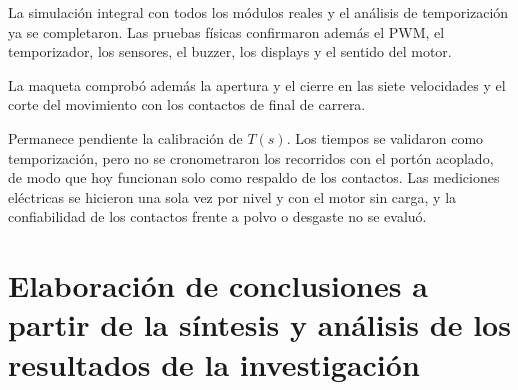 \documentclass[12pt,letterpaper]{article}
\begin{document}
La simulación integral con todos los módulos reales y el
análisis de temporización ya se completaron. Las pruebas
físicas confirmaron además el PWM, el temporizador, los
sensores, el buzzer, los displays y el sentido del motor.

La maqueta comprobó además la apertura y el cierre en
las siete velocidades y el corte del movimiento con los
contactos de final de carrera.

Permanece pendiente la calibración de $T(s)$. Los tiempos
se validaron como temporización, pero no se cronometraron
los recorridos con el portón acoplado, de modo que hoy
funcionan solo como respaldo de los contactos. Las
mediciones eléctricas se hicieron una sola vez por nivel
y con el motor sin carga, y la confiabilidad de los
contactos frente a polvo o desgaste no se evaluó.


\section{Elaboración de conclusiones a partir de la síntesis
y análisis de los resultados de la investigación}
\end{document}
